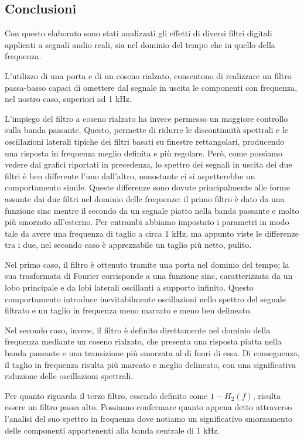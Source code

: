 \documentclass[../main.tex]{subfiles}
\begin{document}
\newpage
\textbf{}
\newpage


\subsection{Conclusioni}

Con questo elaborato sono stati analizzati gli effetti di diversi filtri digitali applicati a segnali audio reali, sia nel dominio del tempo che in quello della frequenza.

L’utilizzo di una porta e di un coseno rialzato, consentono di realizzare un filtro passa-basso capaci di omettere dal segnale in uscita le componenti con frequenza, nel nostro caso, superiori ad 1 kHz.

L’impiego del filtro a coseno rialzato ha invece permesso un maggiore controllo sulla banda passante. Questo, permette di ridurre le discontinuità spettrali e le oscillazioni laterali tipiche dei filtri basati su finestre rettangolari, producendo una risposta in frequenza meglio definita e più regolare.
Però, come possiamo vedere dai grafici riportati in precedenza, lo spettro dei segnali in uscita dei due filtri è ben differente l’uno dall’altro, nonostante ci si aspetterebbe un comportamento simile. 
Queste differenze sono dovute principalmente alle forme assunte dai due filtri nel dominio delle frequenze: il primo filtro è dato da una funzione sinc mentre il secondo da un segnale piatto nella banda passante e molto più smorzato all’esterno. Per entrambi abbiamo impostato i parametri in modo tale da avere una frequenza di taglio a circa 1 kHz, ma appunto viste le differenze tra i due, nel secondo caso è apprezzabile un taglio più netto, pulito.

Nel primo caso, il filtro è ottenuto tramite una porta nel dominio del tempo; la sua trasformata di Fourier corrisponde a una funzione sinc, caratterizzata da un lobo principale e da lobi laterali oscillanti a supporto infinito. Questo comportamento introduce inevitabilmente oscillazioni nello spettro del segnale filtrato e un taglio in frequenza meno marcato e meno ben delineato.

Nel secondo caso, invece, il filtro è definito direttamente nel dominio della frequenza mediante un coseno rialzato, che presenta una risposta piatta nella banda passante e una transizione più smorzata al di fuori di essa. Di conseguenza, il taglio in frequenza risulta più marcato e meglio delineato, con una significativa riduzione delle oscillazioni spettrali.

Per quanto riguarda il terzo filtro, essendo definito come $1 - H_2(f)$, risulta essere un filtro passa alto. Possiamo confermare quanto appena detto attraverso l’analisi del suo spettro in frequenza dove notiamo un significativo smorzamento delle componenti appartenenti alla banda centrale di 1 kHz.
\end{document}
